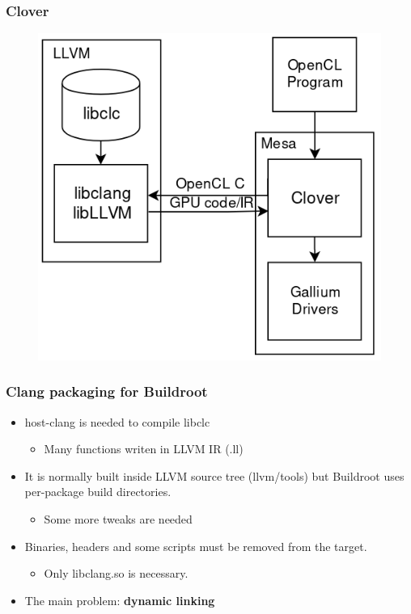\documentclass{smilebeamer}
\begin{document}
\begin{frame}
\frametitle{Clover}
\begin{figure}
\includegraphics[width=0.7\linewidth]{img/clover.png}
\end{figure}
\end{frame}

\begin{frame}
\frametitle{Clang packaging for Buildroot}
\begin{itemize}
  \item host-clang is needed to compile libclc
  \begin{itemize}
    \item Many functions writen in LLVM IR (.ll)
  \end{itemize}
  \item It is normally built inside LLVM source tree (llvm/tools) but Buildroot
  uses per-package build directories.
  \begin{itemize}
    \item Some more tweaks are needed
  \end{itemize}
  \item Binaries, headers and some scripts must be removed from the target.
  \begin{itemize}
    \item Only libclang.so is necessary.
  \end{itemize}
  \item The main problem: \textbf{dynamic linking}
\end{itemize}
\end{frame}
\end{document}
